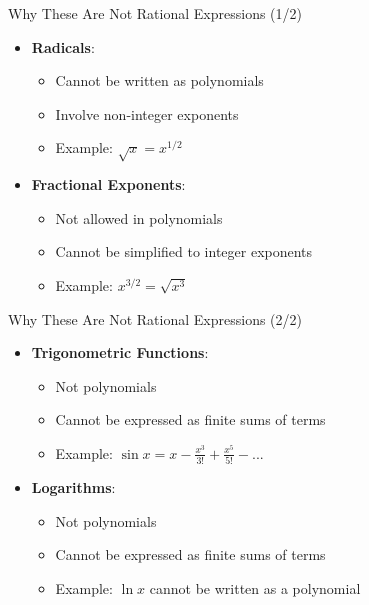 \documentclass[aspectratio=169]{beamer}
\begin{document}
\begin{frame}{Why These Are Not Rational Expressions (1/2)}
\begin{tcolorbox}[colback=lightgray,colframe=primary,title=Explanation: Radicals & Fractional Exponents]
\footnotesize
\begin{itemize}
  \item \textbf{Radicals}: 
  \begin{itemize}
    \item Cannot be written as polynomials
    \item Involve non-integer exponents
    \item Example: $\sqrt{x} = x^{1/2}$
  \end{itemize}

  \item \textbf{Fractional Exponents}:
  \begin{itemize}
    \item Not allowed in polynomials
    \item Cannot be simplified to integer exponents
    \item Example: $x^{3/2} = \sqrt{x^3}$
  \end{itemize}
\end{itemize}
\end{tcolorbox}
\end{frame}


\begin{frame}{Why These Are Not Rational Expressions (2/2)}
\begin{tcolorbox}[colback=lightgray,colframe=primary,title=Explanation: Trig Functions & Logarithms]
\footnotesize
\begin{itemize}
  \item \textbf{Trigonometric Functions}:
  \begin{itemize}
    \item Not polynomials
    \item Cannot be expressed as finite sums of terms
    \item Example: $\sin x = x - \frac{x^3}{3!} + \frac{x^5}{5!} - ...$
  \end{itemize}

  \item \textbf{Logarithms}:
  \begin{itemize}
    \item Not polynomials
    \item Cannot be expressed as finite sums of terms
    \item Example: $\ln x$ cannot be written as a polynomial
  \end{itemize}
\end{itemize}
\end{tcolorbox}
\end{frame}
\end{document}
